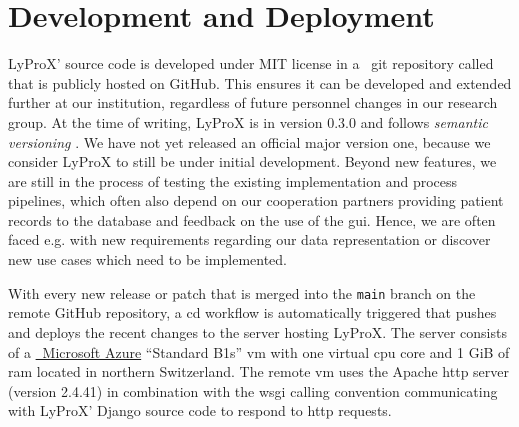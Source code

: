\documentclass[\relativeRoot/main.tex]{subfiles}
\begin{document}
\section{Development and Deployment}
\label{sec:lyprox:dev}

LyProX' source code is developed under MIT license in a ~git \cite{torvalds_git_2022} repository called  that is publicly hosted on GitHub. This ensures it can be developed and extended further at our institution, regardless of future personnel changes in our research group. At the time of writing, LyProX is in version 0.3.0 and follows \emph{semantic versioning} \cite{preston-werner_semantic_nodate}. We have not yet released an official major version one, because we consider LyProX to still be under initial development. Beyond new features, we are still in the process of testing the existing implementation and process pipelines, which often also depend on our cooperation partners providing patient records to the database and feedback on the use of the \gls{gui}. Hence, we are often faced e.g. with new requirements regarding our data representation or discover new use cases which need to be implemented.

With every new release or patch that is merged into the \texttt{main} branch on the remote GitHub repository, a \gls{cd} workflow is automatically triggered that pushes and deploys the recent changes to the server hosting LyProX. The server consists of a \href{https://azure.microsoft.com/}{~Microsoft Azure} ``Standard B1s'' \gls{vm} with one virtual \acrshort{cpu} core and 1 GiB of \acrshort{ram} located in northern Switzerland. The remote \gls{vm} uses the Apache \acrshort{http} server (version 2.4.41) \cite{mccool_apache_nodate} in combination with the \acrshort{wsgi} calling convention \cite{eby_python_2010} communicating with LyProX' Django source code to respond to \acrshort{http} requests.
\end{document}
